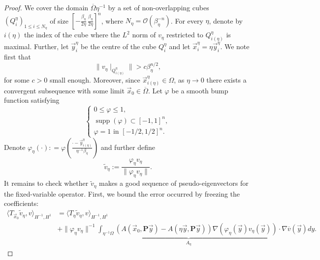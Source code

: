 \documentclass[a4paper,reqno]{amsart}
\numberwithin{equation}{section}
\numberwithin{equation}{section}		%
\numberwithin{figure}{section}			%
\numberwithin{table}{section}				%
\theoremstyle{definition}
\renewcommand{\tilde}{\widetilde}
\renewcommand{\bar}[1]{\overline{#1}}
\newcommand{\<}{\ensuremath \leq}
\renewcommand{\>}{\ensuremath \geq}
\renewcommand{\tilde}{\widetilde}
\begin{document}
\begin{proof}
    We cover the domain $\bar{\Omega}\eta^{-1}$ by a set of non-overlapping cubes $(Q^\eta_i)_{1\leq i\leq N_\eta}$ of size $[-\frac{\beta_\eta}{2\eta}\,\frac{\beta_\eta}{2\eta}]^n$, where $N_\eta = \mathcal{O}(\beta_\eta^{-n})$. For every $\eta$, denote by $i(\eta)$ the index of the cube where the $L^2$ norm of $v_\eta$ restricted to $Q^\eta_{i(\eta)}$ is maximal. Further, let $\vec{y}^\eta_i$ be the centre of the cube $Q^\eta_i$ and let $\vec{x}^\eta_i = \eta\vec{y}^\eta_i$. We note first that
    \begin{equation}\label{eq: FrozenCoefficients1}
        \lVert v_\eta\mid_{Q^\eta_{i(\eta)}}\rVert > c\beta_\eta^{n/2},
    \end{equation}
    for some $c>0$ small enough. Moreover, since $\vec{x}^\eta_{i(\eta)}\in \Omega$, as $\eta\to0$ there exists a convergent subsequence with some limit $\vec{x}_0\in \bar{\Omega}$. Let $\varphi$ be a smooth bump function satisfying
    \begin{equation}
        \begin{cases}
            0 \leq \varphi \leq 1,\\
            \operatorname{supp}(\varphi)\subset[-1,1]^n,\\
            \varphi=1 \text{ in } [-1/2,1/2]^n.
        \end{cases}
    \end{equation}
    Denote $\varphi_\eta(\cdot): = \varphi\left(\frac{\cdot-\vec{y}^\eta_{i(\eta)}}{\eta^{-1}\beta_\eta}\right)$ and further define
    \begin{equation}
        \tilde{v}_\eta := \frac{\varphi_\eta v_\eta}{\lVert \varphi_\eta v_\eta\rVert}.
    \end{equation}
    It remains to check whether $\tilde{v}_\eta$ makes a good sequence of pseudo-eigenvectors for the fixed-variable operator. First, we bound the error occurred by freezing the coefficients: 
    \begin{equation}\label{eq: FrozenCoefficients2}
        \begin{aligned}
            \langle T_{\vec{x}_0}\tilde{v}_\eta,v \rangle_{H^{-1},H^{1}}&=\langle T_{\eta}\tilde{v}_\eta,v \rangle_{H^{-1},H^{1}}\\
            &+ \underbrace{\lVert \varphi_\eta v_\eta\rVert^{-1}\int_{\eta^{-1}\Omega}\left(A\left( \vec{x}_0, \textbf{P}\vec{y}\right)-A\left( \eta\vec{y}, \textbf{P}\vec{y}\right)\right)\nabla  (\varphi_\eta(\vec{y})v_\eta(\vec{y})) \cdot \nabla \overline{v}(\vec{y})dy}_{A_\eta}.    

\end{aligned}
\end{equation}
\end{proof}
\end{document}
